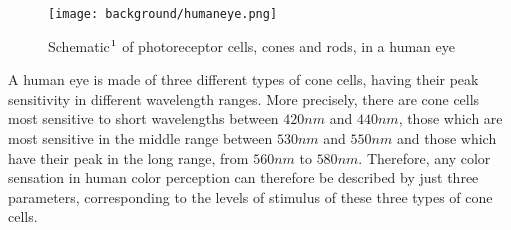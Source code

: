 \begin{figure}[H]
  \centering
  \texttt{[image: background/humaneye.png]}
  \caption[humanayeschematic]{Schematic$\footnotemark$ of photoreceptor cells, cones and rods, in a human eye }
  \label{fig:humaneye}
\end{figure}

A human eye is made of three different types of cone cells, having their peak sensitivity in different wavelength ranges. More precisely, there are cone cells most sensitive to short wavelengths between $420 nm$ and $440 nm$, those which are most sensitive in the middle range between $530 nm$ and $550 nm$ and those which have their peak in the long range, from $560 nm$ to $580 nm$. Therefore, any color sensation in human color perception can therefore be described by just three parameters, corresponding to the levels of stimulus of these three types of cone cells.  


